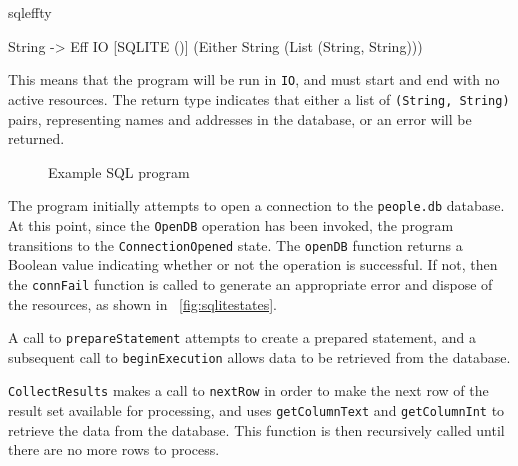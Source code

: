 \noindent
\begin{SaveVerbatim}{sqleffty}

String ->
Eff IO [SQLITE ()] (Either String (List (String, String)))

\end{SaveVerbatim}

\noindent
This means that the program will be run in \texttt{IO}, and must
start and end with no active resources. The return type indicates that either a
list of \texttt{(String, String)} pairs, representing names and addresses in the
database, or an error will be returned.


\begin{figure}[h]
\caption{Example SQL program}
\label{fig:testsel}
\end{figure}

The program initially attempts to open a connection to the \texttt{people.db}
database. At this point, since the \texttt{OpenDB} operation has been invoked,
the program transitions to the \texttt{ConnectionOpened} state. The
\texttt{openDB} function returns a Boolean value indicating whether or not the
operation is successful. If not, then the \texttt{connFail} function is called
to generate an appropriate error and dispose of the resources, as shown in
~\ref{fig:sqlitestates}.

A call to \texttt{prepareStatement} attempts to create a prepared statement,
and a subsequent call to \texttt{beginExecution} allows data to be retrieved
from the database.

\texttt{CollectResults} makes a call to
\texttt{nextRow} in order to make the next row of the result set available for
processing, and uses \texttt{getColumnText} and \texttt{getColumnInt}
to retrieve the data from the database. This function is then
recursively called until there are no more rows to process.


